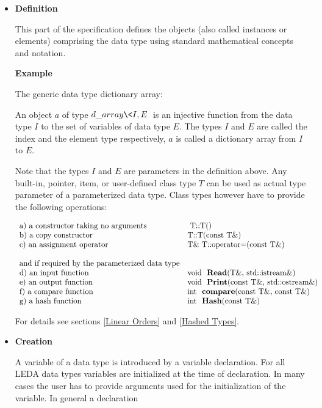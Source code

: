 \begin{itemize}
\item{\bf Definition}

\smallskip
This part of the specification defines the objects (also called instances or
elements) comprising the data type using standard mathematical concepts and 
notation. 

{\bf Example}

The generic data type dictionary array:

An object $a$ of type $d\_array\<I,E\>$ is an injective function from the
data type $I$ to the set of variables of data type $E$. The types $I$ and
$E$ are called the index and the element type respectively, $a$ is called
a dictionary array from $I$ to $E$.

Note that the types $I$ and $E$ are parameters in the definition above.
Any built-in, pointer, item, or user-defined class type $T$ can be used 
as actual type parameter of a parameterized data type. Class types however 
have to provide the following operations:

\[
\begin{array}{ll}
\mbox{a) a constructor taking no arguments} &\mbox{ T::T()} \\
\mbox{b) a copy constructor}     &\mbox{T::T(const T\&)} \\
\mbox{c) an assignment operator} &\mbox{T\&\ T::operator=(const T\&)} \\
\\
\mbox{and if required by the parameterized data type}\\
\mbox{d) an input function}  &\mbox{void \ {\bf Read}(T\&,\ std::istream\&)}\\
\mbox{e) an output function} &\mbox{void \ {\bf Print}(const T\&,\ std::ostream\&)}\\
\mbox{f) a compare function} &\mbox{int \ {\bf compare}(const T\&, const T\&)}\\
\mbox{g) a hash function}    &\mbox{int \ {\bf Hash}(const T\&)}\\
\end{array}
\]


For details see sections \ref{Linear Orders} and \ref{Hashed Types}.


\item {\bf Creation}

\smallskip
A variable of a data type is introduced by a \CC variable declaration. 
For all LEDA data types variables are initialized at the time of declaration. 
In many cases the user has to provide arguments used for the initialization 
of the variable.  In general a declaration


\end{itemize}
